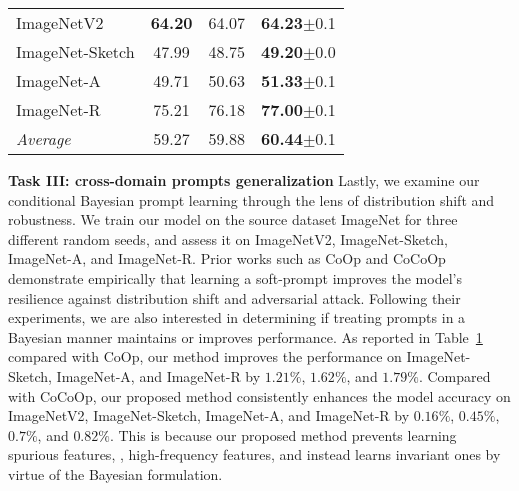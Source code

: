 \documentclass[10pt,twocolumn,letterpaper]{article}
\newcommand{\coop}{CoOp } \newcommand{\coopvpt}{CoOp+VPT } \newcommand{\cocoop}{CoCoOp } \newcommand{\cocoopvpt}{CoCoOp+VPT }
\begin{document}
\begin{table}[t!]
{\begin{tabular}{lccb}
\midrule
ImageNetV2              & \textbf{64.20} & 64.07 & \textbf{64.23}\scriptsize{$\pm$0.1}  \\
ImageNet-Sketch         & 47.99 & 48.75 & \textbf{49.20}\scriptsize{$\pm$0.0}  \\
ImageNet-A              & 49.71 & 50.63 & \textbf{51.33}\scriptsize{$\pm$0.1}  \\
ImageNet-R              & 75.21 & 76.18 & \textbf{77.00}\scriptsize{$\pm$0.1}  \\
\midrule
\textit{Average }       & 59.27 & 59.88 & \textbf{60.44}\scriptsize{$\pm$0.1}  \\
\bottomrule
\end{tabular}}
\label{tab:cross-and-domain}
\end{table}



\textbf{Task III: cross-domain prompts generalization}
Lastly, we examine our conditional Bayesian prompt learning through the lens of distribution shift and robustness. We train our model on the source dataset ImageNet for three different random seeds, and assess it on ImageNetV2, ImageNet-Sketch, ImageNet-A, and ImageNet-R. Prior works such as \coop \cite{zhou2022learning} and \cocoop \cite{zhou2022conditional} demonstrate empirically that learning a soft-prompt improves the model's resilience against distribution shift and adversarial attack. Following their experiments, we are also interested in determining if treating prompts in a Bayesian manner maintains or improves performance. 
As reported in Table~\ref{tab:cross-and-domain} compared with CoOp, our method improves the performance on ImageNet-Sketch, ImageNet-A, and ImageNet-R by $1.21\%$, $1.62\%$, and $1.79\%$. Compared with CoCoOp, our proposed method consistently enhances the model accuracy on ImageNetV2, ImageNet-Sketch, ImageNet-A, and ImageNet-R by $0.16\%$, $0.45\%$, $0.7\%$, and $0.82\%$. This is because our proposed method prevents learning spurious features, \eg, high-frequency features, and instead learns invariant ones by virtue of the Bayesian formulation.
\end{document}
